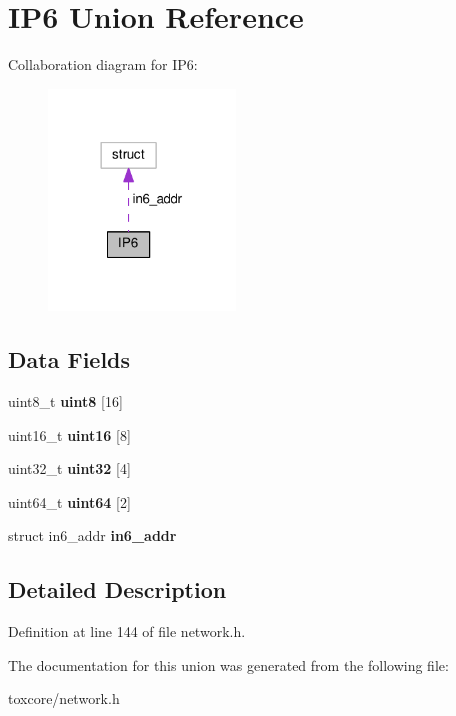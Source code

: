 \hypertarget{union_i_p6}{\section{I\+P6 Union Reference}
\label{union_i_p6}
}


Collaboration diagram for I\+P6\+:
\nopagebreak
\begin{figure}[H]
\begin{center}
\leavevmode
\includegraphics[width=141pt]{union_i_p6__coll__graph}
\end{center}
\end{figure}
\subsection*{Data Fields}
\begin{DoxyCompactItemize}
\item 
\hypertarget{union_i_p6_a6b067d428eefbf1754aa09429b1ba524}{uint8\+\_\+t {\bfseries uint8} \mbox{[}16\mbox{]}}\label{union_i_p6_a6b067d428eefbf1754aa09429b1ba524}

\item 
\hypertarget{union_i_p6_af0f89d2fc8c3ccbcc4fca0156563fcfe}{uint16\+\_\+t {\bfseries uint16} \mbox{[}8\mbox{]}}\label{union_i_p6_af0f89d2fc8c3ccbcc4fca0156563fcfe}

\item 
\hypertarget{union_i_p6_a1d8ab1f6c1da5565bed41e7095610dea}{uint32\+\_\+t {\bfseries uint32} \mbox{[}4\mbox{]}}\label{union_i_p6_a1d8ab1f6c1da5565bed41e7095610dea}

\item 
\hypertarget{union_i_p6_a36c7a85cc2c5062edd5ebf13d46fa343}{uint64\+\_\+t {\bfseries uint64} \mbox{[}2\mbox{]}}\label{union_i_p6_a36c7a85cc2c5062edd5ebf13d46fa343}

\item 
\hypertarget{union_i_p6_ac312c20ade57f180c50585e9ea42314c}{struct in6\+\_\+addr {\bfseries in6\+\_\+addr}}\label{union_i_p6_ac312c20ade57f180c50585e9ea42314c}

\end{DoxyCompactItemize}


\subsection{Detailed Description}


Definition at line 144 of file network.\+h.



The documentation for this union was generated from the following file\+:\begin{DoxyCompactItemize}
\item 
toxcore/network.\+h\end{DoxyCompactItemize}
